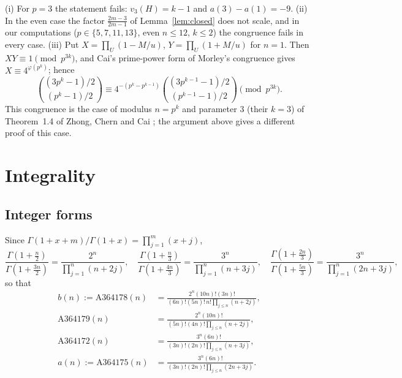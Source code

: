\documentclass[11pt]{amsart}
\begin{document}
\begin{remark}
(i) For $p=3$ the statement fails: $v_3(H)=k-1$ and $a(3)-a(1)=-9$. (ii) In the even case the factor $\frac{2m-3}{2m-1}$ of Lemma~\ref{lem:closed} does not scale, and in our computations ($p\in\{5,7,11,13\}$, even $n\le12$, $k\le2$) the congruence fails in every case. (iii) Put $X=\prod_U(1-M/u)$, $Y=\prod_U(1+M/u)$ for $n=1$. Then $XY\equiv1\pmod{p^{3k}}$, and Cai's prime-power form of Morley's congruence \cite{cai2002,morley1895} gives $X\equiv4^{\varphi(p^k)}$; hence
\[ \binom{(3p^k-1)/2}{(p^k-1)/2}\equiv4^{-(p^k-p^{k-1})}\binom{(3p^{k-1}-1)/2}{(p^{k-1}-1)/2}\pmod{p^{3k}}. \]
This congruence is the case of modulus $n=p^k$ and parameter $3$ (their $k=3$) of Theorem~1.4 of Zhong, Chern and Cai \cite{zhongcherncai2019}; the argument above gives a different proof of this case.
\end{remark}

\section{Integrality}

\subsection{Integer forms} Since $\Gamma(1+x+m)/\Gamma(1+x)=\prod_{j=1}^m(x+j)$,
\[ \frac{\Gamma(1+\frac n2)}{\Gamma(1+\frac{3n}2)}=\frac{2^n}{\prod_{j=1}^n(n+2j)},\quad \frac{\Gamma(1+\frac n3)}{\Gamma(1+\frac{4n}3)}=\frac{3^n}{\prod_{j=1}^n(n+3j)},\quad \frac{\Gamma(1+\frac{2n}3)}{\Gamma(1+\frac{5n}3)}=\frac{3^n}{\prod_{j=1}^n(2n+3j)}, \]
so that
\begin{align*}
b(n):=\text{A364178}(n)&=\frac{2^n(10n)!(3n)!}{(6n)!(5n)!\,n!\prod_{j\le n}(n+2j)}, \\
\text{A364179}(n)&=\frac{2^n(10n)!}{(5n)!(4n)!\prod_{j\le n}(n+2j)},\\
\text{A364172}(n)&=\frac{3^n(6n)!}{(3n)!(2n)!\prod_{j\le n}(n+3j)}, \\
a(n):=\text{A364175}(n)&=\frac{3^n(6n)!}{(3n)!(2n)!\prod_{j\le n}(2n+3j)}.
\end{align*}
\end{document}
